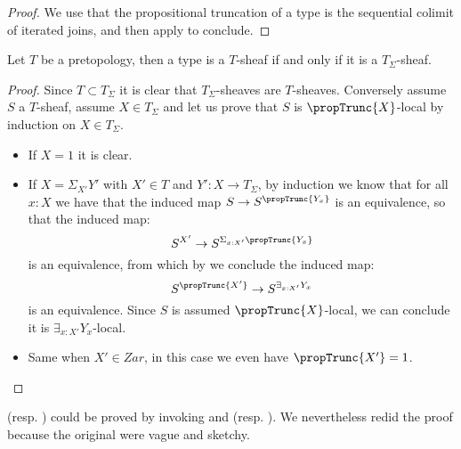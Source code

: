 \begin{proof}
We use that the propositional truncation of a type is the sequential colimit of iterated joins, and then apply  to conclude.
\end{proof}

\begin{lemma}\label{Tsigma-sheaf-generated}
Let $T$ be a pretopology, then a type is a $T$-sheaf if and only if it is a $T_\Sigma$-sheaf.
\end{lemma}

\begin{proof}
Since $T\subset T_\Sigma$ it is clear that $T_\Sigma$-sheaves are $T$-sheaves. Conversely assume $S$ a $T$-sheaf, assume $X\in T_\Sigma$ and let us prove that $S$ is $\propTrunc{X}$-local by induction on $X\in T_\Sigma$.
\begin{itemize}
\item If $X=1$ it is clear.
\item If $X=\Sigma_{X'}Y'$ with $X'\in T$ and $Y':X\to T_\Sigma$, by induction we know that for all $x:X$ we have that the induced map $S\to S^{\propTrunc{Y_x}}$ is an equivalence, so that the induced map:
\[S^{X'}\to S^{\Sigma_{x:X'}\propTrunc{Y_x}}\] 
is an equivalence, from which by  we conclude the induced map:
\[S^{\propTrunc{X'}}\to S^{\exists_{x:X'}Y_x}\]
is an equivalence. Since $S$ is assumed $\propTrunc{X}$-local, we can conclude it is $\exists_{x:X'}Y_x$-local. %
\item Same when $X'\in Zar$, in this case we even have $\propTrunc{X'}=1$.
\end{itemize}
\end{proof}

\begin{remark}
 (resp. ) could be proved by invoking  and  (resp. ). We nevertheless redid the proof because the original were vague and sketchy.
\end{remark}



